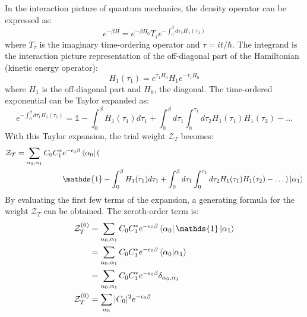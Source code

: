\documentclass[12pt, two sided]{article}
\begin{document}
In the interaction picture of quantum mechanics, the density operator can be expressed as:
%
\begin{equation}
\label{eq:density_op_01}
e^{-\beta H} = e^{-\beta H_0} T_{\tau} e^{- \int_0^{\beta} d\tau_1 H_1(\tau_1)}
\end{equation}
where $T_{\tau}$ is the imaginary time-ordering operator and $\tau = it/\hbar$. The integrand is the interaction picture representation of the off-diagonal part of the Hamiltonian (kinetic energy operator):
%
\begin{equation}
H_1(\tau_1) = e^{\tau_1 H_0} H_1 e^{-\tau_1 H_0}
\end{equation}
%
where $H_1$ is the off-diagonal part and $H_0$, the diagonal. The time-ordered exponential can be Taylor expanded as:
\begin{equation}
e^{- \int_0^{\beta} d\tau_1 H_1(\tau_1)} = \mathds{1} - \int_{0}^{\beta} H_1(\tau_1) d\tau_1 + \int_0^{\beta} d\tau_1 \int_{0}^{\tau_1} d\tau_2 H_1(\tau_1) H_1(\tau_2) - \dots 
\end{equation}
%
With this Taylor expansion, the trial weight $\mathcal{Z}_T$ becomes:
%
\begin{equation}
\begin{aligned}
\mathcal{Z_T} = \sum_{\alpha_0, \alpha_1} C_0 C_1^{*} &e^{-\epsilon_0 \beta}  \bra{\alpha_0} ( \\
& \mathds{1} - \int_{0}^{\beta} H_1(\tau_1) d\tau_1 + \int_0^{\beta} d\tau_1 \int_{0}^{\tau_1} d\tau_2 H_1(\tau_1) H_1(\tau_2) - \dots ) \ket{\alpha_1}
\end{aligned}
\end{equation}
%
By evaluating the first few terms of the expansion, a generating formula for the weight $\mathcal{Z}_T$ can be obtained. The zeroth-order term is:
\begin{equation}
\begin{aligned}
\mathcal{Z}_T^{(0)} &= \sum_{\alpha_0, \alpha_1} C_0 C_1^{*} e^{-\epsilon_0 \beta}  \bra{\alpha_0} \mathds{1} \ket{\alpha_1} \\
&= \sum_{\alpha_0, \alpha_1} C_0 C_1^{*} e^{-\epsilon_0 \beta}  \bra{\alpha_0} \ket{\alpha_1} \\
&= \sum_{\alpha_0, \alpha_1} C_0 C_1^{*} e^{-\epsilon_0 \beta} \delta_{\alpha_0,\alpha_1} \\
\mathcal{Z}_T^{(0)}  &= \sum_{\alpha_0} \vert C_0 \vert^2 e^{-\epsilon_0 \beta}
\end{aligned}
\end{equation}
\end{document}

